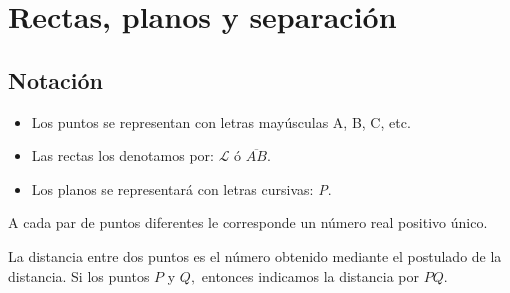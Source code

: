\chapter{Rectas, planos y separación}
\section*{Notación}
\begin{itemize}
\item Los puntos se representan con letras mayúsculas A, B, C, etc.
\begin{center}
\end{center}
\item Las rectas los denotamos por: $\mathscr{L}$ ó $\overline{AB}$.
\begin{center}
\end{center}
\item Los planos se representará con letras cursivas: \textit{P}.
\end{itemize}
\begin{center}
\end{center}

\begin{tcolorbox}[colback=black!9!,colframe=white]
\begin{post} A cada par de puntos diferentes le corresponde un número real positivo único.\\
\end{post}
\end{tcolorbox}

\begin{tcolorbox}[colback=black!3!,colframe=white]
\begin{def.}
La distancia entre dos puntos es el número obtenido mediante el postulado de la distancia. Si los puntos $P$ y $Q,$ entonces indicamos la distancia por $PQ.$
\end{def.}
\end{tcolorbox}



